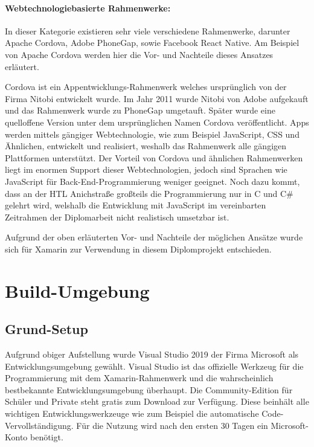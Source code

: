 \paragraph{Webtechnologiebasierte Rahmenwerke: }
In dieser Kategorie existieren sehr viele verschiedene Rahmenwerke, darunter Apache Cordova, Adobe PhoneGap, sowie Facebook React Native.
Am Beispiel von Apache Cordova werden hier die Vor- und Nachteile dieses Ansatzes erläutert.

Cordova ist ein Appentwicklungs-Rahmenwerk welches ursprünglich von der Firma Nitobi entwickelt wurde.
Im Jahr 2011 wurde Nitobi von Adobe aufgekauft und das Rahmenwerk wurde zu PhoneGap umgetauft.
Später wurde eine quelloffene Version unter dem ursprünglichen Namen Cordova veröffentlicht.
Apps werden mittels gängiger Webtechnologie, wie zum Beispiel JavaScript, CSS und Ähnlichen, entwickelt und realisiert, weshalb das Rahmenwerk alle gängigen Plattformen unterstützt.
Der Vorteil von Cordova und ähnlichen Rahmenwerken liegt im enormen Support dieser Webtechnologien, jedoch sind Sprachen wie JavaScript für Back-End-Programmierung weniger geeignet.
Noch dazu kommt, dass an der HTL Anichstraße großteils die Programmierung nur in C und C\# gelehrt wird, welshalb die Entwicklung mit JavaScript im vereinbarten Zeitrahmen der Diplomarbeit nicht realistisch umsetzbar ist.

Aufgrund der oben erläuterten Vor- und Nachteile der möglichen Ansätze wurde sich für Xamarin zur Verwendung in diesem Diplomprojekt entschieden.

\section{Build-Umgebung}
\subsection{Grund-Setup}
Aufgrund obiger Aufstellung wurde Visual Studio 2019 der Firma Microsoft als Entwicklungsumgebung gewählt.
Visual Studio ist das offizielle Werkzeug für die Programmierung mit dem Xamarin-Rahmenwerk und die wahrscheinlich bestbekannte Entwicklungsumgebung überhaupt.
Die Community-Edition für Schüler und Private steht gratis zum Download zur Verfügung.
Diese beinhält alle wichtigen Entwicklungswerkzeuge wie zum Beispiel die automatische Code-Vervollständigung.
Für die Nutzung wird nach den ersten 30 Tagen ein Microsoft-Konto benötigt.\par

